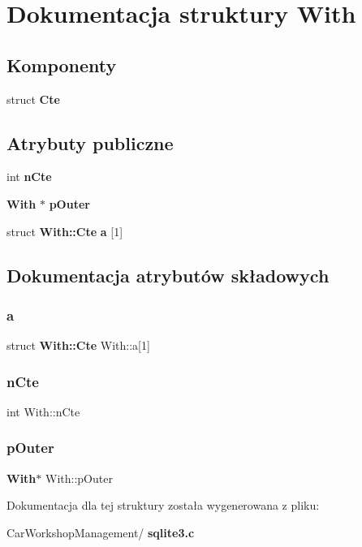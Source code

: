 \section{Dokumentacja struktury With}
\label{struct_with}
\subsection*{Komponenty}
\begin{DoxyCompactItemize}
\item 
struct \textbf{ Cte}
\end{DoxyCompactItemize}
\subsection*{Atrybuty publiczne}
\begin{DoxyCompactItemize}
\item 
int \textbf{ n\+Cte}
\item 
\textbf{ With} $\ast$ \textbf{ p\+Outer}
\item 
struct \textbf{ With\+::\+Cte} \textbf{ a} [1]
\end{DoxyCompactItemize}


\subsection{Dokumentacja atrybutów składowych}
\mbox{\label{struct_with_a9c68a725bc482cbcc65132a4b7b8aaf2}} 
\subsubsection{a}
{\footnotesize\ttfamily struct \textbf{ With\+::\+Cte}  With\+::a[1]}

\mbox{\label{struct_with_a42f5ecda008d1671bb317b8219f5a6ed}} 
\subsubsection{nCte}
{\footnotesize\ttfamily int With\+::n\+Cte}

\mbox{\label{struct_with_ab86b3af65b4e3d4c0b1ee04ffa50e1d9}} 
\subsubsection{pOuter}
{\footnotesize\ttfamily \textbf{ With}$\ast$ With\+::p\+Outer}



Dokumentacja dla tej struktury została wygenerowana z pliku\+:\begin{DoxyCompactItemize}
\item 
Car\+Workshop\+Management/\textbf{ sqlite3.\+c}\end{DoxyCompactItemize}
